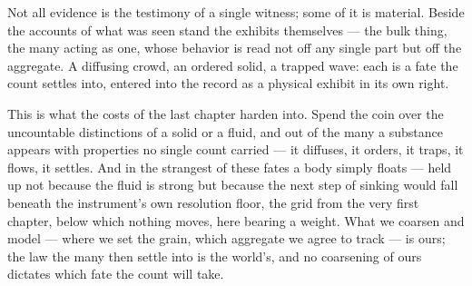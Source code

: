 %
%
%
%

\noindent Not all evidence is the testimony of a single witness; some of it is material. Beside the accounts of
what was seen stand the exhibits themselves --- the bulk thing, the many acting as one, whose behavior is read
not off any single part but off the aggregate. A diffusing crowd, an ordered solid, a trapped wave: each is a
fate the count settles into, entered into the record as a physical exhibit in its own right.

This is what the costs of the last chapter harden into. Spend the coin over the uncountable distinctions of a
solid or a fluid, and out of the many a substance appears with properties no single count carried --- it
diffuses, it orders, it traps, it flows, it settles. And in the strangest of these fates a body simply floats
--- held up not because the fluid is strong but because the next step of sinking would fall beneath the
instrument's own resolution floor, the grid from the very first chapter, below which nothing moves, here bearing
a weight. What we coarsen and model --- where we set the grain, which aggregate we agree to track --- is ours;
the law the many then settle into is the world's, and no coarsening of ours dictates which fate the count will
take.

